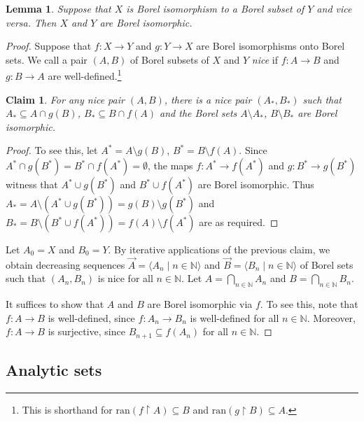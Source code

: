 \documentclass[10pt]{amsart}
\newcommand{\ran}{\mathrm{ran}}
\newcommand{\NN}{\mathbb{N}}
\newtheorem{lemma}[theorem]{Lemma}
\newtheorem*{claim*}{Claim}
\theoremstyle{definition}
\theoremstyle{remark}
\begin{document}
\begin{lemma} 
Suppose that $X$ is Borel isomorphism to a Borel subset of $Y$ and vice versa. 
Then $X$ and $Y$ are Borel isomorphic. 
\end{lemma} 
\begin{proof} 
Suppose that $f\colon X\rightarrow Y$ and $g\colon Y\rightarrow X$ are Borel isomorphisms onto Borel sets. 
We call a pair $(A,B)$ of Borel subsets of $X$ and $Y$ \emph{nice} if $f\colon A\rightarrow B$ and $g\colon B\rightarrow A$ are well-defined.\footnote{This is shorthand for $\ran(f{\upharpoonright}A)\subseteq B$ and $\ran(g{\upharpoonright}B)\subseteq A$. } 

\begin{claim*} 
For any nice pair $(A,B)$, there is a nice pair $(A_*,B_*)$ such that $A_*\subseteq A\cap g(B)$, $B_*\subseteq B\cap f(A)$ and the Borel sets $A\setminus A_*$, $B\setminus B_*$ are Borel isomorphic. 
\end{claim*} 
\begin{proof} 
To see this, let $A^*=A\setminus g(B)$, $B^*=B\setminus f(A)$. 
Since $A^*\cap g(B^*)=B^*\cap f(A^*)=\emptyset$, the maps $f\colon A^*\rightarrow f(A^*)$ and $g\colon B^*\rightarrow g(B^*)$ witness that 
$A^*\cup g(B^*)$ and $B^*\cup f(A^*)$ are Borel isomorphic. 
Thus $A_*=A\setminus (A^*\cup g(B^*))=g(B) \setminus g(B^*)$ and $B_*=B\setminus (B^*\cup f(A^*))=f(A)\setminus f(A^*)$ are as required. 
\end{proof} 

Let $A_0=X$ and $B_0=Y$. By iterative applications of the previous claim, we obtain decreasing sequences $\vec{A}=\langle A_n\mid n\in\NN\rangle$ and $\vec{B}=\langle B_n\mid n\in\NN\rangle$ of Borel sets such that $(A_n, B_n)$ is nice for all $n\in\NN$. Let $A=\bigcap_{n\in\NN} A_n$ and $B=\bigcap_{n\in\NN}B_n$. 

It suffices to show that $A$ and $B$ are Borel isomorphic via $f$. 
To see this, note that $f\colon A\rightarrow B$ is well-defined, since $f\colon A_n\rightarrow B_n$ is well-defined for all $n\in\NN$. 
Moreover, $f\colon A\rightarrow B$ is surjective, since $B_{n+1}\subseteq f(A_n)$ for all $n\in \NN$. 
\end{proof} 





\subsection{Analytic sets} 
\end{document}

